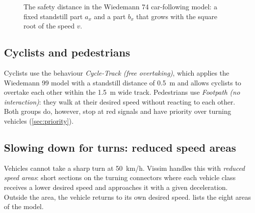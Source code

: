 \documentclass[11pt,a4paper]{article}
\newcommand{\kmh}{~km/h}
\begin{document}
\begin{figure}[!htb]
\centering
{}
\caption[Safety distance in the Wiedemann 74 model]{The safety distance in the Wiedemann 74
car-following model: a fixed standstill part $a_x$ and a part $b_x$ that grows with the square root
of the speed $v$.}
\label{fig:w74}
\end{figure}

\subsection{Cyclists and pedestrians}

Cyclists use the behaviour \emph{Cycle-Track (free overtaking)}, which applies the Wiedemann 99
model with a standstill distance of 0.5~m and allows cyclists to overtake each other within the
1.5~m wide track. Pedestrians use \emph{Footpath (no interaction)}: they walk at their desired speed
without reacting to each other. Both groups do, however, stop at red signals and have priority over
turning vehicles (\cref{sec:priority}).

\subsection{Slowing down for turns: reduced speed areas}
\label{sec:rsa}

Vehicles cannot take a sharp turn at 50\kmh. Vissim handles this with \emph{reduced speed areas}:
short sections on the turning connectors where each vehicle class receives a lower desired speed
and approaches it with a given deceleration. Outside the area, the vehicle returns to its own
desired speed.  lists the eight areas of the model.
\end{document}
